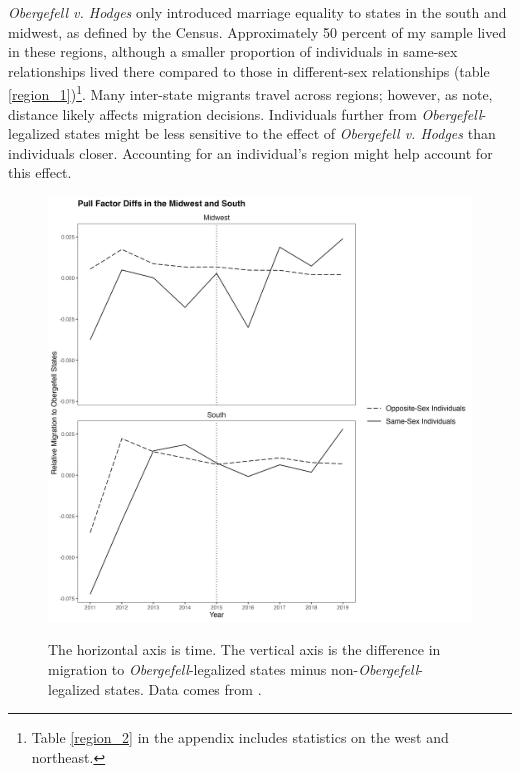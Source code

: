 \documentclass[12pt,letterpaper]{article}
\begin{document}
\textit{Obergefell v. Hodges} only introduced marriage equality to states in the south and midwest, as defined by the Census. Approximately 50 percent of my sample lived in these regions, although a smaller proportion of individuals in same-sex relationships lived there compared to those in different-sex relationships (table \ref{region_1})\footnote{Table \ref{region_2} in the appendix includes statistics on the west and northeast.}. Many inter-state migrants travel across regions; however, as \citet{1} note, distance likely affects migration decisions. Individuals further from \textit{Obergefell}-legalized states might be less sensitive to the effect of \textit{Obergefell v. Hodges} than individuals closer. Accounting for an individual’s region might help account for this effect.
\FloatBarrier
\begin{figure}[htbp]
    \centering
    \caption{}
    \label{fig: region_post_diffs}
    \includegraphics[width=.75\linewidth]{outputs/summary_stats/region_post_diffs.png}

    \vspace{0.5em}
    \begin{minipage}{0.75\linewidth}
        \footnotesize The horizontal axis is time. The vertical axis is the difference in migration to \textit{Obergefell}-legalized states minus non-\textit{Obergefell}-legalized states. Data comes from \citet{28}.
    \end{minipage}
\end{figure}
\end{document}

